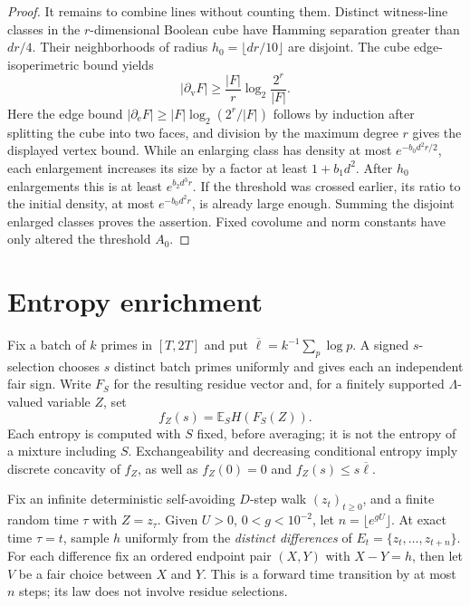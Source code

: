 \documentclass[11pt]{article}
\numberwithin{equation}{section}
\theoremstyle{definition}\newtheorem{definition}[theorem]{Definition}
\theoremstyle{remark}\newtheorem{remark}[theorem]{Remark}
\newcommand{\E}{\mathbb E}\newcommand{\Prob}{\mathbb P}
\newcommand{\abs}[1]{\lvert #1\rvert}
\newcommand{\set}[1]{\{#1\}}
\newcommand{\Lb}{\overline{\ell}}
\begin{document}
\begin{proof}
It remains to combine lines without counting them. Distinct witness-line classes in the $r$-dimensional Boolean cube have Hamming separation greater than $dr/4$. Their neighborhoods of radius $h_0=\lfloor dr/10\rfloor$ are disjoint. The cube edge-isoperimetric bound yields
\[
 \abs{\partial_{\mathrm v}F}\ge\frac{\abs F}{r}
                   \log_2\frac{2^r}{\abs F}.
\]
Here the edge bound $\abs{\partial_{\mathrm e}F}\ge\abs F\log_2(2^r/\abs F)$ follows by induction after splitting the cube into two faces, and division by the maximum degree $r$ gives the displayed vertex bound. While an enlarging class has density at most $e^{-b_0d^2r/2}$, each enlargement increases its size by a factor at least $1+b_1d^2$. After $h_0$ enlargements this is at least $e^{b_2d^3r}$. If the threshold was crossed earlier, its ratio to the initial density, at most $e^{-b_0d^2r}$, is already large enough. Summing the disjoint enlarged classes proves the assertion. Fixed covolume and norm constants have only altered the threshold $A_0$.
\end{proof}

\section{Entropy enrichment}\label{sec:enrichment}

Fix a batch of $k$ primes in $[T,2T]$ and put $\Lb=k^{-1}\sum_p\log p$. A signed $s$-selection chooses $s$ distinct batch primes uniformly and gives each an independent fair sign. Write $F_S$ for the resulting residue vector and, for a finitely supported $\Lambda$-valued variable $Z$, set
\[
 f_Z(s)=\E_S H(F_S(Z)).
\]
Each entropy is computed with $S$ fixed, before averaging; it is not the entropy of a mixture including $S$. Exchangeability and decreasing conditional entropy imply discrete concavity of $f_Z$, as well as $f_Z(0)=0$ and $f_Z(s)\le s\Lb$.

Fix an infinite deterministic self-avoiding $D$-step walk $(z_t)_{t\ge0}$, and a finite random time $\tau$ with $Z=z_\tau$. Given $U>0$, $0<g<10^{-2}$, let $n=\lfloor e^{gU}\rfloor$. At exact time $\tau=t$, sample $h$ uniformly from the \emph{distinct differences} of $E_t=\set{z_t,\ldots,z_{t+n}}$. For each difference fix an ordered endpoint pair $(X,Y)$ with $X-Y=h$, then let $V$ be a fair choice between $X$ and $Y$. This is a forward time transition by at most $n$ steps; its law does not involve residue selections.
\end{document}
